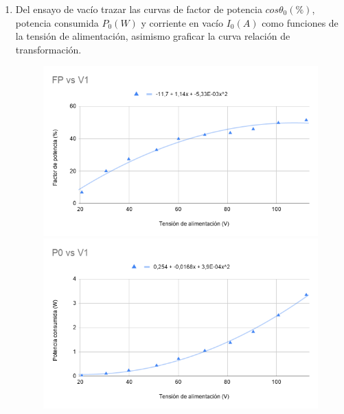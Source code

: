\documentclass[12pt]{article}
\begin{document}
\begin{enumerate}
    \item Del ensayo de vacío trazar las curvas de factor de potencia $cos\theta_{0}(\%)$, potencia consumida $P_{0}(W)$ y corriente en vacío $I_{0}(A)$ como funciones de la tensión de alimentación, asimismo graficar la curva relación de transformación.
    \begin{figure}[H]
    \centering
        \begin{minipage}{.5\textwidth}
          \centering
          \includegraphics[width=.95\linewidth]{FPvsV1.png}
          \captionsetup{labelformat=empty}
        \end{minipage}%
        \begin{minipage}{.5\textwidth}
          \centering
          \includegraphics[width=.95\linewidth]{P0vsV1.png}
          \captionsetup{labelformat=empty}
        \end{minipage}
    \end{figure}
    

\end{enumerate}
\end{document}
